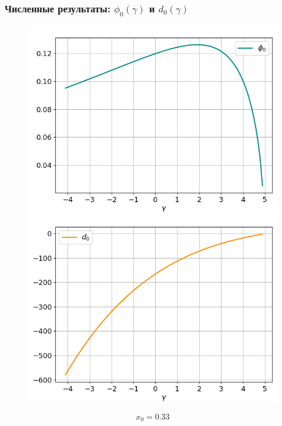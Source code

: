 \documentclass[fullscreen=true, unicode, bookmarks=false]{beamer}
\begin{document}
\begin{frame}
\frametitle{ Численные результаты: $ \phi_0(\gamma) $ и $ d_0(\gamma) $ }

\begin{figure} 
\includegraphics[scale=0.33]{oscillating_phi0_13.png}  
\hfill
\includegraphics[scale=0.33]{oscillating_d0_13.png}  
\end{figure}

$$ x_0 = 0.33 $$

\end{frame}
\end{document}
